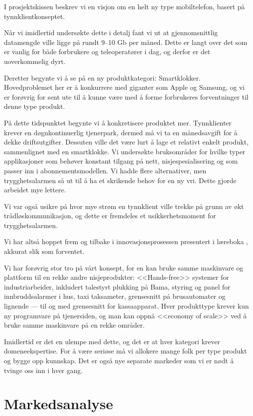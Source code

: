 I prosjektskissen beskrev vi en visjon om en helt ny type mobiltelefon, basert
på tynnklientkonseptet.  

Når vi imidlertid undersøkte dette i detalj fant vi ut
at gjennomsnittlig datamengde ville ligge på rundt 9--10 Gb per måned. Dette er
langt over det som er vanlig for både forbrukere og teleoperatører i dag, og
derfor er det uoverkommelig dyrt.

Deretter begynte vi å se på en ny produktkategori: Smartklokker. Hovedproblemet
her er å konkurrere med giganter som Apple og Samsung, og vi er forøvrig for
sent ute til å kunne være med å forme forbrukeres forventninger til denne type
produkt.

På dette tidspunktet begynte vi å konkretisere produktet mer. Tynnklienter
krever en døgnkontinuerlig tjenerpark, dermed må vi ta en månedsavgift for å
dekke driftsutgifter. Dessuten ville det være lurt å lage et relativt enkelt
produkt, sammenlignet med en smartklokke. Vi undersøkte bruksområder for hvilke
typer applikasjoner som behøver konstant tilgang på nett, nisjespesialisering og som passer inn i
abonnementsmodellen. Vi hadde flere alternativer, men trygghetsalarmen så ut
til å ha et skrikende behov for en ny vri. Dette gjorde arbeidet mye lettere.

Vi var også usikre på hvor mye strøm en tynnklient ville trekke på grunn av økt
trådløskommunikasjon, og dette er fremdeles et usikkerhetsmoment for
trygghetsalarmen.

Vi har altså hoppet frem og tilbake i innovasjonsprosessen presentert i
læreboka \cite{bessant}, akkurat slik som forventet.

Vi har forøvrig stor tro på vårt konsept, for en kan bruke samme maskinvare og
plattform til en rekke andre nisjeprodukter: <<Hands-free>> systemer for
industriarbeider, inkludert talestyrt plukking på Bama, styring og panel for
innbruddsalarmer i hus, taxi taksameter, grensesnitt på brusautomater og
lignende --- til og med grensesnitt for kassaapparat.  Hver produkttype krever
kun ny programvare på tjenersiden, og man kan oppnå <<economy of scale>> ved å
bruke samme maskinvare på en rekke områder.

Imidlertid er det en ulempe med dette, og det er at hver kategori krever
domeneekspertise. For å være seriøse må vi allokere mange folk per type produkt
og bygge opp kunnskap. Det er også nye separate markeder som vi er nødt å
tvinge oss inn i hver gang.


\section{Markedsanalyse}
\label{marked}

